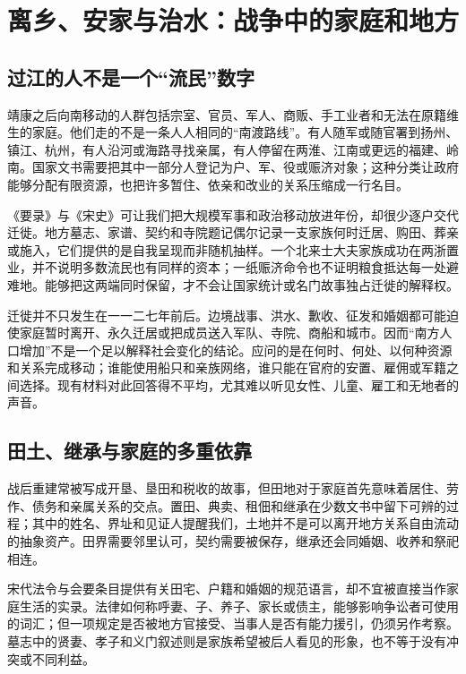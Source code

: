 \section{离乡、安家与治水：战争中的家庭和地方}

\subsection{过江的人不是一个“流民”数字}

靖康之后向南移动的人群包括宗室、官员、军人、商贩、手工业者和无法在原籍维生的家庭。他们走的不是一条人人相同的“南渡路线”。有人随军或随官署到扬州、镇江、杭州，有人沿河或海路寻找亲属，有人停留在两淮、江南或更远的福建、岭南。国家文书需要把其中一部分人登记为户、军、役或赈济对象；这种分类让政府能够分配有限资源，也把许多暂住、依亲和改业的关系压缩成一行名目。

《要录》与《宋史》可让我们把大规模军事和政治移动放进年份，却很少逐户交代迁徙。地方墓志、家谱、契约和寺院题记偶尔记录一支家族何时迁居、购田、葬亲或施入，它们提供的是自我呈现而非随机抽样。一个北来士大夫家族成功在两浙置业，并不说明多数流民也有同样的资本；一纸赈济命令也不证明粮食抵达每一处避难地。能够把这两端同时保留，才不会让国家统计或名门故事独占迁徙的解释权。

迁徙并不只发生在一一二七年前后。边境战事、洪水、歉收、征发和婚姻都可能迫使家庭暂时离开、永久迁居或把成员送入军队、寺院、商船和城市。因而“南方人口增加”不是一个足以解释社会变化的结论。应问的是在何时、何处、以何种资源和关系完成移动；谁能使用船只和亲族网络，谁只能在官府的安置、雇佣或军籍之间选择。现有材料对此回答得不平均，尤其难以听见女性、儿童、雇工和无地者的声音。

\subsection{田土、继承与家庭的多重依靠}

战后重建常被写成开垦、垦田和税收的故事，但田地对于家庭首先意味着居住、劳作、债务和亲属关系的交点。置田、典卖、租佃和继承在少数文书中留下可辨的过程；其中的姓名、界址和见证人提醒我们，土地并不是可以离开地方关系自由流动的抽象资产。田界需要邻里认可，契约需要被保存，继承还会同婚姻、收养和祭祀相连。

宋代法令与会要条目提供有关田宅、户籍和婚姻的规范语言，却不宜被直接当作家庭生活的实录。法律如何称呼妻、子、养子、家长或债主，能够影响争讼者可使用的词汇；但一项规定是否被地方官接受、当事人是否有能力援引，仍须另作考察。墓志中的贤妻、孝子和义门叙述则是家族希望被后人看见的形象，也不等于没有冲突或不同利益。

